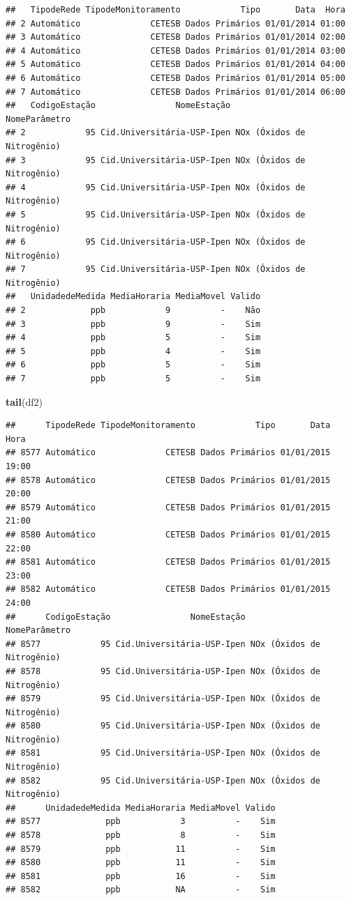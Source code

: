 \documentclass[]{book}
\newenvironment{Shaded}{\begin{snugshade}}{\end{snugshade}}
\newcommand{\KeywordTok}[1]{\textcolor[rgb]{0.13,0.29,0.53}{\textbf{#1}}}
\newcommand{\NormalTok}[1]{#1}
\theoremstyle{definition}
\theoremstyle{definition}
\theoremstyle{definition}
\theoremstyle{remark}
\begin{document}
\begin{verbatim}
##   TipodeRede TipodeMonitoramento            Tipo       Data  Hora
## 2 Automático              CETESB Dados Primários 01/01/2014 01:00
## 3 Automático              CETESB Dados Primários 01/01/2014 02:00
## 4 Automático              CETESB Dados Primários 01/01/2014 03:00
## 5 Automático              CETESB Dados Primários 01/01/2014 04:00
## 6 Automático              CETESB Dados Primários 01/01/2014 05:00
## 7 Automático              CETESB Dados Primários 01/01/2014 06:00
##   CodigoEstação                NomeEstação              NomeParâmetro
## 2            95 Cid.Universitária-USP-Ipen NOx (Óxidos de Nitrogênio)
## 3            95 Cid.Universitária-USP-Ipen NOx (Óxidos de Nitrogênio)
## 4            95 Cid.Universitária-USP-Ipen NOx (Óxidos de Nitrogênio)
## 5            95 Cid.Universitária-USP-Ipen NOx (Óxidos de Nitrogênio)
## 6            95 Cid.Universitária-USP-Ipen NOx (Óxidos de Nitrogênio)
## 7            95 Cid.Universitária-USP-Ipen NOx (Óxidos de Nitrogênio)
##   UnidadedeMedida MediaHoraria MediaMovel Valido
## 2             ppb            9          -    Não
## 3             ppb            9          -    Sim
## 4             ppb            5          -    Sim
## 5             ppb            4          -    Sim
## 6             ppb            5          -    Sim
## 7             ppb            5          -    Sim
\end{verbatim}

\begin{Shaded}
\begin{Highlighting}[]
\KeywordTok{tail}\NormalTok{(df2)}
\end{Highlighting}
\end{Shaded}

\begin{verbatim}
##      TipodeRede TipodeMonitoramento            Tipo       Data  Hora
## 8577 Automático              CETESB Dados Primários 01/01/2015 19:00
## 8578 Automático              CETESB Dados Primários 01/01/2015 20:00
## 8579 Automático              CETESB Dados Primários 01/01/2015 21:00
## 8580 Automático              CETESB Dados Primários 01/01/2015 22:00
## 8581 Automático              CETESB Dados Primários 01/01/2015 23:00
## 8582 Automático              CETESB Dados Primários 01/01/2015 24:00
##      CodigoEstação                NomeEstação              NomeParâmetro
## 8577            95 Cid.Universitária-USP-Ipen NOx (Óxidos de Nitrogênio)
## 8578            95 Cid.Universitária-USP-Ipen NOx (Óxidos de Nitrogênio)
## 8579            95 Cid.Universitária-USP-Ipen NOx (Óxidos de Nitrogênio)
## 8580            95 Cid.Universitária-USP-Ipen NOx (Óxidos de Nitrogênio)
## 8581            95 Cid.Universitária-USP-Ipen NOx (Óxidos de Nitrogênio)
## 8582            95 Cid.Universitária-USP-Ipen NOx (Óxidos de Nitrogênio)
##      UnidadedeMedida MediaHoraria MediaMovel Valido
## 8577             ppb            3          -    Sim
## 8578             ppb            8          -    Sim
## 8579             ppb           11          -    Sim
## 8580             ppb           11          -    Sim
## 8581             ppb           16          -    Sim
## 8582             ppb           NA          -    Sim
\end{verbatim}
\end{document}
